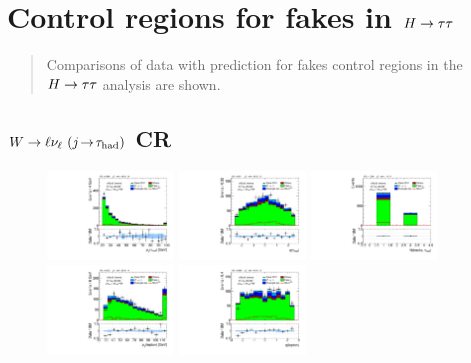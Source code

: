 \chapter[Control regions for fakes in $\Htautau$][Control regions for fakes in $\Htautau$]{Control regions for fakes in $\Htautau$}
\label{apx:control-regions}

\begin{quote}
Comparisons of data with prediction for fakes control regions in the $\Htautau$ analysis are shown.
\end{quote}

\section{$W \rightarrow \ell\nu_\ell \ (j\!\rightarrow\!\tau_\text{had})$ CR}

\begin{figure}[!htpb]
  \centering
  \includegraphics[width=0.30\textwidth]{figures/analysis/vbf-WlvCR/tau-pt}
  \includegraphics[width=0.30\textwidth]{figures/analysis/vbf-WlvCR/tau-eta}
  \includegraphics[width=0.30\textwidth]{figures/analysis/vbf-WlvCR/tau-numTrack}
  \includegraphics[width=0.30\textwidth]{figures/analysis/vbf-WlvCR/lep-pt-hi}
  \includegraphics[width=0.30\textwidth]{figures/analysis/vbf-WlvCR/lep-eta}

\end{figure}
